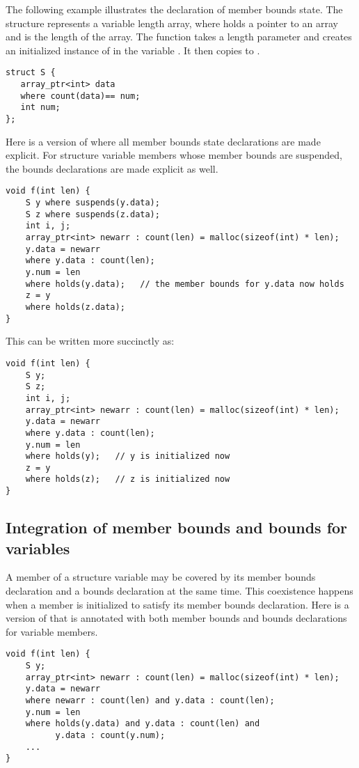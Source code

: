 The following example illustrates the declaration of member bounds
state. The structure  represents a variable length array,
where  holds a pointer to an array and  is the 
length of the array. The function  takes a length parameter  
 and creates an initialized instance of  in the 
variable .  It then copies  to .

\begin{lstlisting}
struct S {
   array_ptr<int> data
   where count(data)== num;
   int num;
};
\end{lstlisting}

Here is a version of  where all member bounds state declarations are
made explicit. For structure variable members whose member bounds are
suspended, the bounds declarations are made explicit as well.

\begin{lstlisting}
void f(int len) {
    S y where suspends(y.data);
    S z where suspends(z.data);
    int i, j;
    array_ptr<int> newarr : count(len) = malloc(sizeof(int) * len);
    y.data = newarr
    where y.data : count(len);
    y.num = len
    where holds(y.data);   // the member bounds for y.data now holds
    z = y
    where holds(z.data);
}
\end{lstlisting}

This can be written more succinctly as:

\begin{lstlisting}
void f(int len) {
    S y;
    S z;
    int i, j;
    array_ptr<int> newarr : count(len) = malloc(sizeof(int) * len);
    y.data = newarr
    where y.data : count(len);
    y.num = len
    where holds(y);   // y is initialized now
    z = y
    where holds(z);   // z is initialized now
}
\end{lstlisting}

\subsection{Integration of member bounds and bounds for variables}

A member of a structure variable may be covered by its member bounds
declaration and a bounds declaration at the same time. This coexistence
happens when a member is initialized to satisfy its member bounds
declaration. Here is a version of  that is annotated with both member
bounds and bounds declarations for variable members.
\begin{lstlisting}
void f(int len) {
    S y;
    array_ptr<int> newarr : count(len) = malloc(sizeof(int) * len);
    y.data = newarr
    where newarr : count(len) and y.data : count(len);
    y.num = len
    where holds(y.data) and y.data : count(len) and 
          y.data : count(y.num);
    ...
}
\end{lstlisting}

